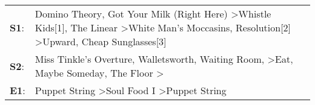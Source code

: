 \begin{supertabular}{p{0.03\textwidth}p{0.92\textwidth}}
 \textbf{S1}:  &  Domino Theory\textsuperscript{}, \enspace Got Your Milk (Right Here)\textsuperscript{} \textgreater \enspace Whistle Kids[1]\textsuperscript{}, \enspace The Linear\textsuperscript{} \textgreater \enspace White Man's Moccasins\textsuperscript{}, \enspace Resolution[2]\textsuperscript{} \textgreater \enspace Upward\textsuperscript{}, \enspace Cheap Sunglasses[3]\textsuperscript{}  \enspace  \\
 \textbf{S2}:  &                                                          Miss Tinkle's Overture\textsuperscript{}, \enspace Walletsworth\textsuperscript{}, \enspace Waiting Room\textsuperscript{}, \textsuperscript{} \textgreater \enspace Eat\textsuperscript{}, \enspace Maybe Someday\textsuperscript{}, \enspace The Floor\textsuperscript{} \textgreater {}\textsuperscript{}  \enspace  \\
 \textbf{E1}:  &                                                                                                                                                                                                                                                     Puppet String\textsuperscript{} \textgreater \enspace Soul Food I\textsuperscript{} \textgreater \enspace Puppet String\textsuperscript{}  \enspace  \\
\end{supertabular}
